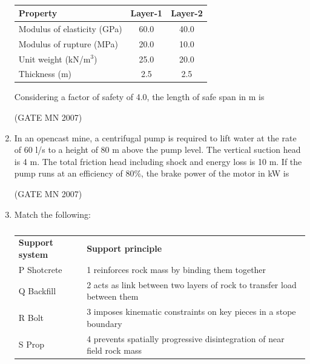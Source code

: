 \documentclass[journal]{IEEEtran}
\begin{document}
\begin{enumerate}
\begin{table}[H]
    \centering\normalsize
\begin{tabular}{|l|c|c|}
\hline
Property & Layer-1 & Layer-2 \\
\hline
Modulus of elasticity (GPa) & 60.0 & 40.0 \\
\hline
Modulus of rupture (MPa) & 20.0 & 10.0 \\
\hline
Unit weight (kN/m$^3$) & 25.0 & 20.0 \\
\hline
Thickness (m) & 2.5 & 2.5 \\
\hline
\end{tabular}
\caption{}
    \label{tab:Q37}
\end{table}

Considering a factor of safety of 4.0, the length of safe span in m is


\hfill (GATE MN 2007)
\begin{enumerate}
\end{enumerate}


\item In an opencast mine, a centrifugal pump is required to lift water at the rate of 60 l/s to a height of 80 m above the pump level. The vertical suction head is 4 m. The total friction head including shock and energy loss is 10 m. If the pump runs at an efficiency of 80\%, the brake power of the motor in kW is


	\hfill (GATE MN 2007)
\begin{enumerate}
\end{enumerate}



\item Match the following:
\begin{table}[H]
    \centering\normalsize
\begin{tabular}{p{5cm} p{5cm}}
\textbf{Support system} & \textbf{Support principle} \\
P \quad Shotcrete & 1 \quad reinforces rock mass by binding them together \\
Q \quad Backfill & 2 \quad acts as link between two layers of rock to transfer load between them \\
R \quad Bolt & 3 \quad imposes kinematic constraints on key pieces in a stope boundary \\
S \quad Prop & 4 \quad prevents spatially progressive disintegration of near field rock mass \\
\end{tabular}
 \caption{}
    \label{tab:Q39}
\end{table}



\end{enumerate}
\end{document}
